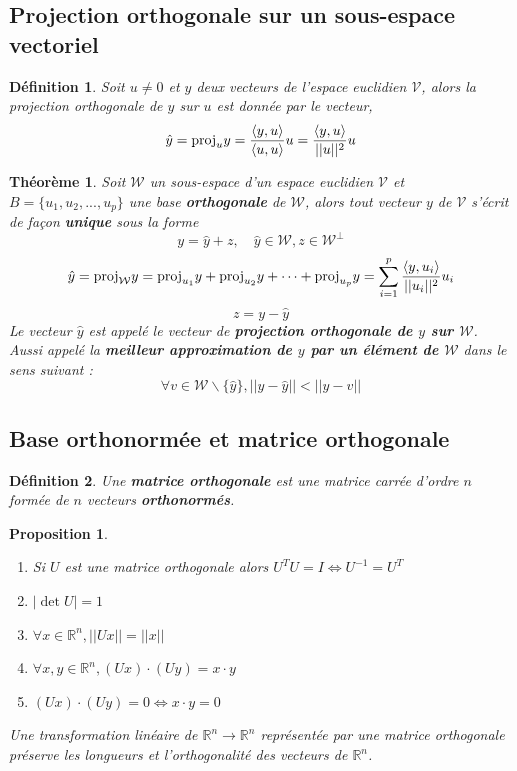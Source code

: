 \documentclass{article}[french, babel]
\newtheorem{mydef}{Définition}
\newtheorem{myprop}{Proposition}
\newtheorem{mythm}{Théorème}
\newcommand{\proj}[2]{\text{\normalfont{proj}}_#1 #2}
\newcommand{\prodsc}[2]{\langle #1,#2\rangle}
\begin{document}
	\subsection{Projection orthogonale sur un sous-espace vectoriel}
		\begin{mydef}
			Soit $u\neq 0$ et $y$ deux vecteurs de l'espace euclidien $\mathcal{V}$, alors la projection orthogonale de $y$ sur $u$ est donnée par le vecteur,
			\[\hat{y}=\proj{u}{y}=\frac{\prodsc{y}{u}}{\prodsc{u}{u}}u=\frac{\prodsc{y}{u}}{||u||^2} u\]
		\end{mydef}
		\begin{mythm}
			Soit $\mathcal{W}$ un sous-espace d'un espace euclidien $\mathcal{V}$ et $B=\{u_1,u_2,...,u_p\}$ une base \textbf{orthogonale} de $\mathcal{W}$, alors tout vecteur $y$ de $\mathcal{V}$ s'écrit de façon \textbf{unique} sous la forme \[y=\hat{y}+z,\quad \hat{y}\in\mathcal{W}, z\in\mathcal{W}^{\perp}\]
			\[\hat{y}=\proj{\mathcal{W}}{y}=\proj{{u_1}}{y}+\proj{{u_2}}{y}+\dots+\proj{{u_p}}{y} = \sum_{i=1}^{p} \frac{\prodsc{y}{u_i}}{||u_i||^2} u_i\]
			\[z=y-\hat{y}\]
			Le vecteur $\hat{y}$ est appelé le vecteur de \textbf{projection orthogonale de $y$ sur $\mathcal{W}$}. Aussi appelé la \textbf{meilleur approximation de $y$ par un élément de $\mathcal{W}$} dans le sens suivant :
			\[\forall v\in\mathcal{W}\backslash\{\hat{y}\}, ||y-\hat{y}||< ||y-v||\]
		\end{mythm}
	\subsection{Base orthonormée et matrice orthogonale}
		\begin{mydef}
			Une \textbf{matrice orthogonale} est une matrice carrée d'ordre $n$ formée de $n$ vecteurs \textbf{orthonormés}.
		\end{mydef}
		\begin{myprop}
			~
			\begin{enumerate}
				\item Si $U$ est une matrice orthogonale alors $U^T U=I \Longleftrightarrow U^{-1}=U^T$
				\item $|\det U| = 1$
				\item $\forall x\in\mathbb{R}^n,||Ux||=||x||$
				\item $\forall x,y\in\mathbb{R}^n,(Ux)\cdot (Uy)=x\cdot y$
				\item $(Ux)\cdot (Uy)=0\Longleftrightarrow x\cdot y=0$
			\end{enumerate}
			Une transformation linéaire de $\mathbb{R}^n\longrightarrow\mathbb{R}^n$ représentée par une matrice orthogonale préserve les longueurs et l'orthogonalité des vecteurs de $\mathbb{R}^n$.
		\end{myprop}
\end{document}
